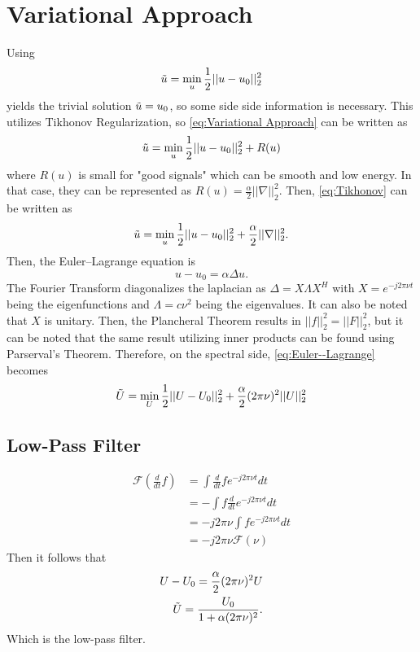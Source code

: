 \documentclass[11pt]{article}
\begin{document}
\section{Variational Approach}
Using
\begin{equation}\label{eq:Variational Approach}
    \Tilde{u} = \min_u \frac{1}{2}||u - u_0||_2^2
\end{equation}
yields the trivial solution $\Tilde{u} =u_0$, so some side side information is necessary.
This utilizes Tikhonov Regularization, so \eqref{eq:Variational Approach} can be written as
\begin{equation}\label{eq:Tikhonov}
    \Tilde{u} = \min_u \frac{1}{2}||u - u_0||_2^2 + R(u)
\end{equation}
where $R(u)$ is small for "good signals" which can be smooth and low energy.  In that case, they can be represented as $R(u) = \frac{\alpha}{2}||\nabla ||_2^2$.
Then, \eqref{eq:Tikhonov} can be written as
\begin{equation}
    \Tilde{u} = \min_u \frac{1}{2}||u - u_0||_2^2 + \frac{\alpha}{2}||\nabla ||_2^2.
\end{equation}
Then, the Euler--Lagrange equation is
\begin{equation}\label{eq:Euler--Lagrange}
    u - u_0 = \alpha \Delta u.
\end{equation}
The Fourier Transform diagonalizes the laplacian as $\Delta = X\Lambda X^H$ with $X = e^{-j2 \pi \nu t}$ being the eigenfunctions and $\Lambda = c\nu^2$ being the eigenvalues.
It can also be noted that $X$ is unitary.
Then, the Plancheral Theorem results in $||f||_2^2 = ||F||_2^2$, but it can be noted that the same result utilizing inner products can be found using Parserval's Theorem.
Therefore, on the spectral side, \eqref{eq:Euler--Lagrange} becomes
\begin{equation}
    \Tilde{U} = \min_U \frac{1}{2}||U-U_0||_2^2 + \frac{\alpha}{2}(2\pi \nu)^2 ||U||_2^2
\end{equation}
\subsection{Low-Pass Filter}
\begin{equation}
    \begin{split}
        \mathscr{F}(\frac{d}{dt}f) &= \int \frac{d}{dt}f e^{-j2 \pi \nu t}dt\\
        &= - \int f \frac{d}{dt} e^{-j2 \pi \nu t}dt\\
        &= -j2 \pi \nu \int fe^{-j2 \pi \nu t}dt\\
        &= -j2 \pi \nu \mathscr{F}(\nu)
    \end{split}
\end{equation}
Then it follows that 
\begin{equation}
    \begin{split}
        U - U_0 = \frac{\alpha}{2}(2\pi \nu)^2 U\\
        \Tilde{U} = \frac{U_0}{1 + \alpha(2\pi \nu)^2}.
    \end{split}
\end{equation}
Which is the low-pass filter.
\end{document}
